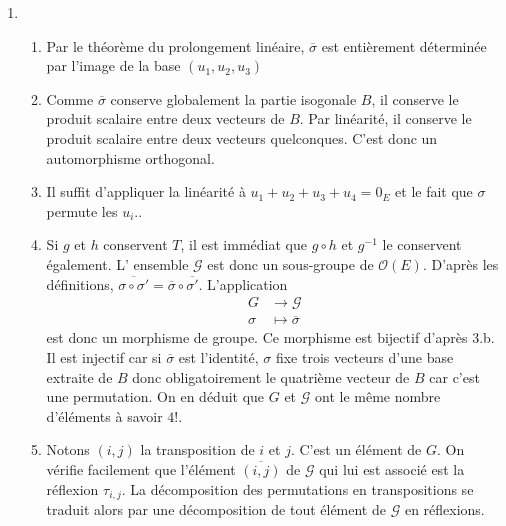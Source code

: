 \begin{enumerate}
\item 
\begin{enumerate}
\item  Par le théorème du prolongement linéaire, $\overline{\sigma}$  est entièrement déterminée par l'image de la base $(u_1,u_2,u_3)$
\item Comme $\overline{\sigma}$ conserve globalement la partie isogonale $B$, il conserve le produit scalaire entre deux vecteurs de $B$. Par linéarité, il conserve le produit scalaire entre deux vecteurs quelconques. C'est donc un automorphisme orthogonal.
\item  Il suffit d'appliquer la linéarité à $u_1+u_2+u_3+u_4=0_E$ et le fait que $\sigma$ permute les $u_i$..
\item Si $g$ et $h$ conservent $T$, il est immédiat que $g\circ h$ et $g^{-1}$ le conservent également. L' ensemble $\mathcal G$ est donc un sous-groupe de $\mathcal O(E)$.\newline
D'après les définitions, $\overline{\sigma\circ \sigma'}=\overline{\sigma}\circ\overline{\sigma'}$. L'application
\begin{displaymath}
 \begin{aligned}
  G&\rightarrow \mathcal G \\
 \sigma &\mapsto \overline{\sigma}
 \end{aligned}
\end{displaymath}
est donc un morphisme de groupe. Ce morphisme est bijectif d'après 3.b. Il est injectif car si $\overline{\sigma}$ est l'identité, $\sigma$ fixe trois vecteurs d'une base extraite de $B$ donc obligatoirement le quatrième vecteur de $B$ car c'est une permutation.\newline
On en déduit que $G$ et $\mathcal G$ ont le même nombre d'éléments à savoir $4!$.
\item Notons $(i,j)$ la transposition de $i$ et $j$. C'est un élément de $G$. On vérifie facilement que l'élément $\overline{(i,j)}$ de $\mathcal{G}$ qui lui est associé est la réflexion $\tau_{i,j}$. La décomposition des permutations en transpositions se traduit alors par une décomposition de tout élément de $\mathcal G$ en réflexions.
\end{enumerate}

\end{enumerate}

